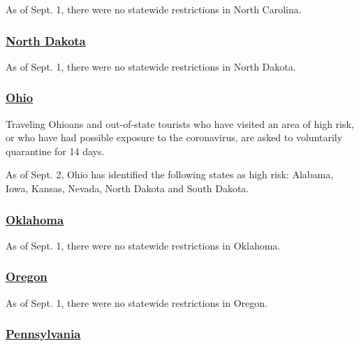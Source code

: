 As of Sept. 1, there were no statewide restrictions in North Carolina.

\hypertarget{north-dakota}{%
\subsubsection{\texorpdfstring{\href{https://www.health.nd.gov/diseases-conditions/coronavirus/travel}{North
Dakota}}{North Dakota}}\label{north-dakota}}

As of Sept. 1, there were no statewide restrictions in North Dakota.

\hypertarget{ohio}{%
\subsubsection{\texorpdfstring{\href{https://coronavirus.ohio.gov/wps/portal/gov/covid-19/families-and-individuals/COVID-19-Travel-Advisory/}{Ohio}}{Ohio}}\label{ohio}}

Traveling Ohioans and out-of-state tourists who have visited an area of
high risk, or who have had possible exposure to the coronavirus, are
asked to voluntarily quarantine for 14 days.

As of Sept. 2, Ohio has identified the following states as high risk:
Alabama, Iowa, Kansas, Nevada, North Dakota and South Dakota.

\hypertarget{oklahoma}{%
\subsubsection{\texorpdfstring{\href{https://coronavirus.health.ok.gov/travel}{Oklahoma}}{Oklahoma}}\label{oklahoma}}

As of Sept. 1, there were no statewide restrictions in Oklahoma.

\hypertarget{oregon}{%
\subsubsection{\texorpdfstring{\href{https://traveloregon.com/travel-alerts/}{Oregon}}{Oregon}}\label{oregon}}

As of Sept. 1, there were no statewide restrictions in Oregon.

\hypertarget{pennsylvania}{%
\subsubsection{\texorpdfstring{\href{https://www.health.pa.gov/topics/disease/coronavirus/Pages/Travelers.aspx}{Pennsylvania}}{Pennsylvania}}\label{pennsylvania}}

